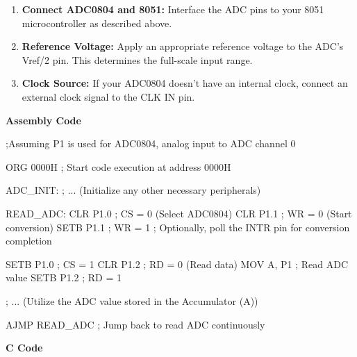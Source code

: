 \documentclass[
]{article}
\newenvironment{Shaded}{}{}
\newcommand{\NormalTok}[1]{#1}
\begin{document}
\begin{enumerate}
\def\labelenumi{\arabic{enumi}.}
\item
  \textbf{Connect ADC0804 and 8051:} Interface the ADC pins to your 8051
  microcontroller as described above.
\item
  \textbf{Reference Voltage:} Apply an appropriate reference voltage to
  the ADC's Vref/2 pin. This determines the full-scale input range.
\item
  \textbf{Clock Source:} If your ADC0804 doesn't have an internal clock,
  connect an external clock signal to the CLK IN pin.
\end{enumerate}

\textbf{Assembly Code}

\begin{Shaded}
\begin{Highlighting}[]
\NormalTok{;Assuming P1 is used for ADC0804, analog input to ADC channel 0}

\NormalTok{ORG 0000H ; Start code execution at address 0000H}

\NormalTok{ADC\_INIT:}
\NormalTok{    ; ... (Initialize any other necessary peripherals)}

\NormalTok{READ\_ADC:}
\NormalTok{    CLR P1.0  ; CS = 0 (Select ADC0804)}
\NormalTok{    CLR P1.1  ; WR = 0 (Start conversion)}
\NormalTok{    SETB P1.1 ; WR = 1}
\NormalTok{    ; Optionally, poll the INTR pin for conversion completion}

\NormalTok{    SETB P1.0 ; CS = 1}
\NormalTok{    CLR P1.2  ; RD = 0 (Read data)}
\NormalTok{    MOV A, P1 ; Read ADC value}
\NormalTok{    SETB P1.2 ; RD = 1}

\NormalTok{    ; ... (Utilize the ADC value stored in the Accumulator (A))}

\NormalTok{AJMP READ\_ADC ; Jump back to read ADC continuously}
\end{Highlighting}
\end{Shaded}

\textbf{C Code}
\end{document}
